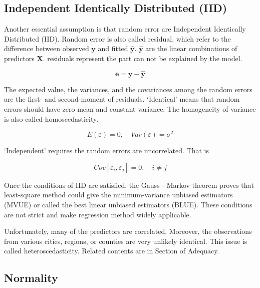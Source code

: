 \documentclass[
  11pt,
  openany]{memoir}
\begin{document}
\hypertarget{independent-identically-distributed-iid}{%
\subsection{Independent Identically Distributed (IID)}\label{independent-identically-distributed-iid}}

Another essential assumption is that random error are Independent Identically Distributed (IID). Random error is also called residual, which refer to the difference between observed \(\mathbf{y}\) and fitted \(\mathbf{\hat y}\). \(\mathbf{\hat y}\) are the linear combinations of predictors \(\mathbf{X}\). residuals represent the part can not be explained by the model.

\begin{equation}
\mathbf{e}=\mathbf{y}-\mathbf{\hat y}
\label{eq:residual}
\end{equation}

The expected value, the variances, and the covariances among the random errors are the first- and second-moment of residuals. `Identical' means that random errors should have zero mean and constant variance. The homogeneity of variance is also called homoscedasticity.

\begin{equation}
E(\varepsilon) = 0, \quad Var(\varepsilon) = \sigma^2
\label{eq:identical}
\end{equation}

`Independent' requires the random errors are uncorrelated. That is

\begin{equation}
Cov[\varepsilon_i,\varepsilon_j] = 0,\quad i\neq j
\label{eq:indenpendent}
\end{equation}

Once the conditions of IID are satisfied, the Gauss - Markov theorem proves that least-square method could give the minimum-variance unbiased estimators (MVUE) or called the best linear unbiased estimators (BLUE). These conditions are not strict and make regression method widely applicable.

Unfortunately, many of the predictors are correlated. Moreover, the observations from various cities, regions, or counties are very unlikely identical. This issue is called heteroscedasticity. Related contents are in Section of Adequacy.

\hypertarget{normality}{%
\subsection{Normality}\label{normality}}
\end{document}
